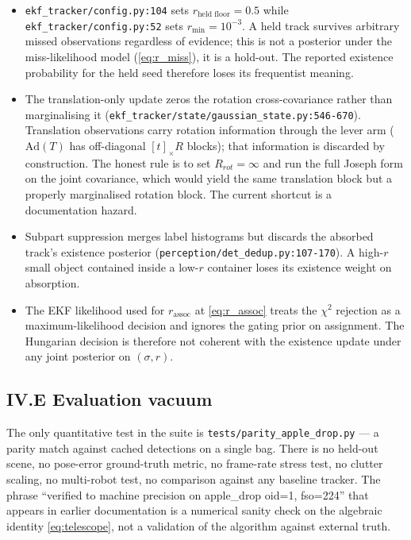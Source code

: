\documentclass[11pt]{article}
\newcommand{\Ad}{\mathrm{Ad}}
\begin{document}
\begin{itemize}[leftmargin=1.5em,itemsep=0pt,topsep=2pt]
\item \texttt{ekf\_tracker/config.py:104} sets $r_{\text{held floor}}=0.5$
  while \texttt{ekf\_tracker/config.py:52} sets $r_{\min}=10^{-3}$. A held
  track survives arbitrary missed observations regardless of evidence;
  this is not a posterior under the miss-likelihood model
  (\eqref{eq:r_miss}), it is a hold-out. The reported existence
  probability for the held seed therefore loses its frequentist meaning.
\item The translation-only update zeros the rotation cross-covariance
  rather than marginalising it
  (\texttt{ekf\_tracker/state/gaussian\_state.py:546-670}). Translation
  observations carry rotation information through the lever arm
  ($\Ad(T)$ has off-diagonal $[t]_\times R$ blocks); that information is
  discarded by construction. The honest rule is to set $R_{rot}=\infty$
  and run the full Joseph form on the joint covariance, which would
  yield the same translation block but a properly marginalised rotation
  block. The current shortcut is a documentation hazard.
\item Subpart suppression merges label histograms but discards the
  absorbed track's existence posterior
  (\texttt{perception/det\_dedup.py:107-170}). A high-$r$ small object
  contained inside a low-$r$ container loses its existence weight on
  absorption.
\item The EKF likelihood used for $r_{\text{assoc}}$ at
  \eqref{eq:r_assoc} treats the $\chi^2$ rejection as a maximum-likelihood
  decision and ignores the gating prior on assignment. The Hungarian
  decision is therefore not coherent with the existence update under any
  joint posterior on $(\sigma,r)$.
\end{itemize}

\subsection*{IV.E Evaluation vacuum}

The only quantitative test in the suite is
\texttt{tests/parity\_apple\_drop.py} --- a parity match against cached
detections on a single bag. There is no held-out scene, no pose-error
ground-truth metric, no frame-rate stress test, no clutter scaling, no
multi-robot test, no comparison against any baseline tracker. The phrase
``verified to machine precision on apple\_drop oid=1, fso=224'' that
appears in earlier documentation is a numerical sanity check on the
algebraic identity \eqref{eq:telescope}, not a validation of the algorithm
against external truth.
\end{document}
